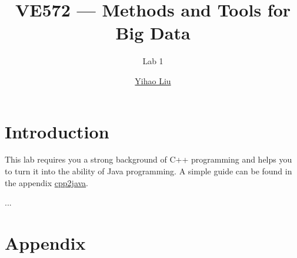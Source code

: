 \documentclass[11pt,a4paper]{article}
\title{VE572 --- Methods and Tools for Big Data}
\subtitle{Lab 1}
\author{\href{mailto:liuyh615@sjtu.edu.cn}{Yihao Liu}}
\begin{document}
\maketitle

\section{Introduction}

This lab requires you a strong background of C++ programming and helps you to turn it into the ability of Java programming. A simple guide can be found in the appendix \hyperlink{cpp2java}{cpp2java}.

...




\section{Appendix}
\hypertarget{cpp2java}{\ }

\end{document}
